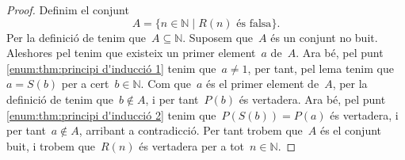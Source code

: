 \documentclass[../../main.tex]{subfiles}
\begin{document}
    \begin{proof}
        Definim el conjunt
        \[
            A=\{n\in\mathbb{N}\mid R(n)\text{ és falsa}\}.
        \]
        Per la definició de  tenim que~\(A\subseteq\mathbb{N}\).
        Suposem que~\(A\) és un conjunt no buit.
        Aleshores pel  tenim que existeix un primer element~\(a\) de~\(A\).
        Ara bé, pel punt \eqref{enum:thm:principi d'inducció 1} tenim que~\(a\neq1\), per tant, pel lema  tenim que~\(a=S(b)\) per a cert~\(b\in\mathbb{N}\).
        Com que~\(a\) és el primer element de~\(A\), per la definició de  tenim que~\(b\notin A\), i per tant~\(P(b)\) és vertadera.
        Ara bé, pel punt \eqref{enum:thm:principi d'inducció 2} tenim que~\(P(S(b))=P(a)\) és vertadera, i per tant~\(a\notin A\), arribant a contradicció.
        Per tant trobem que~\(A\) és el conjunt buit, i trobem que~\(R(n)\) és vertadera per a tot~\(n\in\mathbb{N}\).
    \end{proof}
\end{document}
